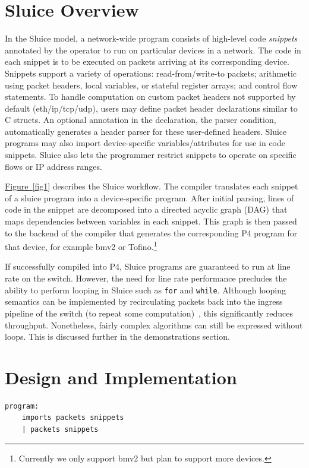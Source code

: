 \documentclass[12pt, oneside]{article}
\newcommand{\irref}[2]{\hyperref[#2]{#1~\ref{#2}}}
\begin{document}
\newpage
\section{Sluice Overview}
In the Sluice model, a network-wide program consists of high-level code
\textit{snippets} annotated by the operator to run on particular devices in a
network. The code in each snippet is to be executed on packets arriving at its
corresponding device. Snippets support a variety of operations:
read-from/write-to packets; arithmetic using packet headers, local variables, or
stateful register arrays; and control flow statements. To handle computation on
custom packet headers not supported by default (eth/ip/tcp/udp), users may
define packet header declarations similar to C structs. An optional annotation
in the declaration, the parser condition, automatically generates a header
parser for these user-defined headers. Sluice programs may also import
device-specific variables/attributes for use in code snippets. Sluice also lets
the programmer restrict snippets to operate on specific flows or IP address
ranges.

\irref{Figure}{fig1} describes the Sluice workflow. The compiler translates each snippet of
a sluice program into a device-specific program. After initial parsing, lines
of code in the snippet are decomposed into a directed acyclic graph (DAG) that
maps dependencies between variables in each snippet. This graph is then passed
to the backend of the compiler that generates the corresponding P4 program for
that device, for example bmv2 or Tofino.\footnote{Currently we only support
bmv2 but plan to support more devices.} 

If successfully compiled into P4, Sluice programs are guaranteed to run at line rate on the switch. However, the need for line rate performance precludes the ability to perform looping in Sluice such as \texttt{for} and \texttt{while}. Although looping semantics can be implemented by recirculating packets back into the ingress pipeline of the switch (to repeat some computation)~\cite{p4Spec}, this significantly reduces throughput. Nonetheless, fairly complex algorithms can still be expressed without loops. This is discussed further in the demonstrations section. 

\newpage
\section{Design and Implementation}

\begin{lstlisting}[basicstyle=\linespread{1.3}\scriptsize,  numberstyle=\tiny, backgroundcolor = \color{teagreen}, frame=tlrb]
program:
	imports packets snippets				
	| packets snippets
\end{lstlisting}
\end{document}
